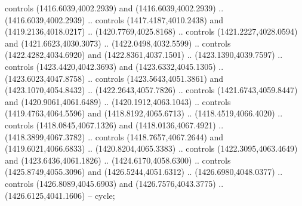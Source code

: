 \begin{scope}[shift={(-343.28256,-575.56596)}]
\begin{scope}[shift={(-736.04956,-3272.8657)}]
      controls (1416.6039,4002.2939) and (1416.6039,4002.2939) ..
      (1416.6039,4002.2939) .. controls (1417.4187,4010.2438) and
      (1419.2136,4018.0217) .. (1420.7769,4025.8168) .. controls
      (1421.2227,4028.0594) and (1421.6623,4030.3073) .. (1422.0498,4032.5599) ..
      controls (1422.4282,4034.6920) and (1422.8361,4037.1501) ..
      (1423.1390,4039.7597) .. controls (1423.4420,4042.3693) and
      (1423.6332,4045.1305) .. (1423.6023,4047.8758) .. controls
      (1423.5643,4051.3861) and (1423.1070,4054.8432) .. (1422.2643,4057.7826) ..
      controls (1421.6743,4059.8447) and (1420.9061,4061.6489) ..
      (1420.1912,4063.1043) .. controls (1419.4763,4064.5596) and
      (1418.8192,4065.6713) .. (1418.4519,4066.4020) .. controls
      (1418.0845,4067.1326) and (1418.0136,4067.4921) .. (1418.3899,4067.3782) ..
      controls (1418.7657,4067.2644) and (1419.6021,4066.6833) ..
      (1420.8204,4065.3383) .. controls (1422.3095,4063.4649) and
      (1423.6436,4061.1826) .. (1424.6170,4058.6300) .. controls
      (1425.8749,4055.3096) and (1426.5244,4051.6312) .. (1426.6980,4048.0377) ..
      controls (1426.8089,4045.6903) and (1426.7576,4043.3775) ..
      (1426.6125,4041.1606) -- cycle;


\end{scope}
\end{scope}
